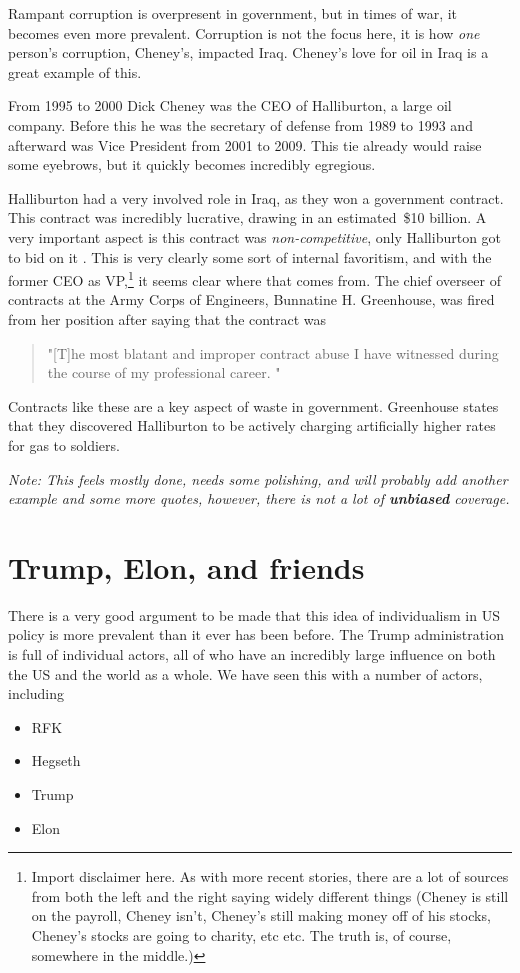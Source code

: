 \documentclass{article}
\begin{document}
        Rampant corruption is overpresent in government, but in times of war, it becomes even more prevalent. Corruption is not the focus here, it is how \textit{one} person's corruption, Cheney's, impacted Iraq. Cheney's love for oil in Iraq is a great example of this.

        From 1995 to 2000 Dick Cheney was the CEO of Halliburton, a large oil company. Before this he was the secretary of defense from 1989 to 1993 and afterward was Vice President from 2001 to 2009. This tie already would raise some eyebrows, but it quickly becomes incredibly egregious. 
        
        Halliburton had a very involved role in Iraq, as they won a government contract. This contract was incredibly lucrative, drawing in an estimated~\$10 billion. A very important aspect is this contract was \textit{non-competitive}, only Halliburton got to bid on it \cite{bbc2008iraqcontracts}. This is very clearly some sort of internal favoritism, and with the former CEO as VP,\footnote{Import disclaimer here. As with more recent stories, there are a lot of sources from both the left and the right saying widely different things (Cheney is still on the payroll, Cheney 
        isn't, Cheney's still making money off of his stocks, Cheney's stocks are going to charity, etc etc. The truth is, of course, somewhere in the middle.)}
        it seems clear where that comes from. The chief overseer of contracts at the Army Corps of Engineers, Bunnatine H. Greenhouse, was fired from her position after saying that the contract was 
        \begin{quote}
            "[T]he most blatant and improper contract abuse I have witnessed during the course of my professional career. \cite{nytimes2005halliburtoncontract}"
        \end{quote}  
        Contracts like these are a key aspect of waste in government. Greenhouse states that they discovered Halliburton to be actively charging artificially higher rates for gas to soldiers. \cite{nytimes2005halliburtoncontract}

        \textit{Note: This feels mostly done, needs some polishing, and will probably add another example and some more quotes, however, there is not a lot of \textbf{unbiased} coverage. }
        
        

\section{Trump, Elon, and friends}
    There is a very good argument to be made that this idea of individualism in US policy is more prevalent than it ever has been before. The Trump administration is full of individual actors, all of who have an incredibly large influence on both the US and the world as a whole. We have seen this with a number of actors, including 
    \begin{itemize}
        \item RFK
        \item Hegseth 
        \item Trump
        \item Elon
    \end{itemize}
\end{document}
